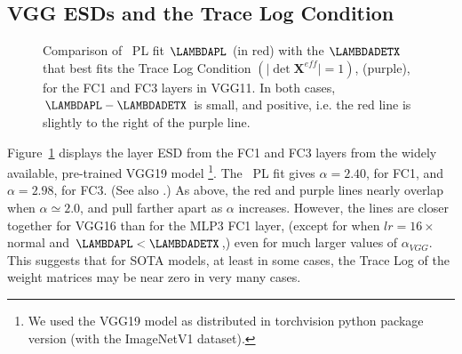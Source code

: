 \subsection{VGG ESDs and the Trace Log Condition}
\begin{figure}[t]
    \centering
    \caption{Comparison of \WW~PL fit $\LAMBDAPL$ (in red) with the $\LAMBDADETX$ that best fits the Trace Log 
        Condition $\left(\vert \det \mathbf{X}^{eff}\vert = 1\right)$, (purple), for the FC1 and FC3 layers in VGG11. In 
        both cases, $\LAMBDAPL - \LAMBDADETX$ is small, and positive, i.e. the red line is slightly to the right of the 
        purple line.
    }
  \label{fig:VGG11_esds}
\end{figure}

Figure~\ref{fig:VGG11_esds} displays the layer ESD from the FC1 and FC3 layers from
the widely available, pre-trained VGG19 model
\footnote{We used the VGG19 model as distributed in torchvision python package version (with the ImageNetV1 dataset).}.
The \WW~PL fit gives $\alpha=2.40$, for FC1, and $\alpha=2.98$, for FC3. (See also \cite{MM18_TR_JMLRversion}.)
As above, the red and purple lines nearly overlap when $\alpha\simeq 2.0$,
and pull farther apart as $\alpha$ increases.
However, the lines are closer together for VGG16 than for the MLP3 FC1 layer, (except for when $lr=16\times$ normal and 
$\LAMBDAPL < \LAMBDADETX$,) even for much larger values of $\alpha_{VGG}$.
This suggests that for SOTA models, at least in some cases, the Trace Log of
the weight matrices may be near zero in very many cases.
